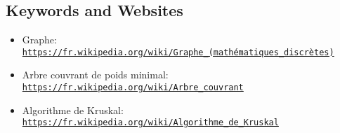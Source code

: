 \documentclass[a4paper,11pt]{report}
\newcommand{\BrochureUrlText}[1]{\texttt{#1}}
\begin{document}
{\raggedright

\subsection*{Keywords and Websites}

\begin{itemize}
  \item Graphe: \href{https://fr.wikipedia.org/wiki/Graphe_(math\%C3\%A9matiques_discr\%C3\%A8tes)}{\BrochureUrlText{https://fr.wikipedia.org/wiki/Graphe\_(mathématiques\_discrètes)}}
  \item Arbre couvrant de poids minimal: \href{https://fr.wikipedia.org/wiki/Arbre_couvrant}{\BrochureUrlText{https://fr.wikipedia.org/wiki/Arbre\_couvrant}}
  \item Algorithme de Kruskal: \href{https://fr.wikipedia.org/wiki/Algorithme_de_Kruskal}{\BrochureUrlText{https://fr.wikipedia.org/wiki/Algorithme\_de\_Kruskal}}
\end{itemize}


}
\end{document}
